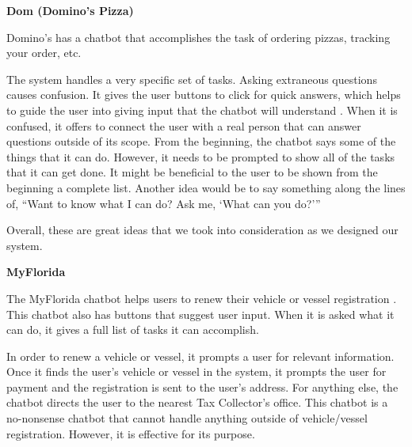 \documentclass[titlepage, 12pt]{article}
\begin{document}
\textbf{Dom (Domino's Pizza)}

Domino’s has a chatbot that accomplishes the task of ordering pizzas, tracking your order, etc.

The system handles a very specific set of tasks. Asking extraneous questions causes confusion. It gives the user buttons to click for quick answers, which helps to guide the user into giving input that the chatbot will understand \cite{bib-1-16}. When it is confused, it offers to connect the user with a real person that can answer questions outside of its scope. From the beginning, the chatbot says some of the things that it can do. However, it needs to be prompted to show all of the tasks that it can get done. It might be beneficial to the user to be shown from the beginning a complete list. Another idea would be to say something along the lines of, “Want to know what I can do? Ask me, ‘What can you do?’”

Overall, these are great ideas that we took into consideration as we designed our system. 

\textbf{MyFlorida}

The MyFlorida chatbot helps users to renew their vehicle or vessel registration \cite{bib-1-17}. This chatbot also has buttons that suggest user input. When it is asked what it can do, it gives a full list of tasks it can accomplish.

In order to renew a vehicle or vessel, it prompts a user for relevant information. Once it finds the user’s vehicle or vessel in the system, it prompts the user for payment and the registration is sent to the user’s address. For anything else, the chatbot directs the user to the nearest Tax Collector’s office. This chatbot is a no-nonsense chatbot that cannot handle anything outside of vehicle/vessel registration. However, it is effective for its purpose.

\end{document}
